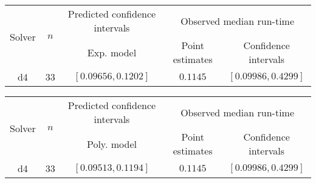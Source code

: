 \begin{tabular}{ccccc}
\hline 
\multirow{2}{*}{Solver} & \multirow{2}{*}{$n$} & Predicted confidence intervals & \multicolumn{2}{c}{Observed median  run-time}\tabularnewline
 &  & Exp. model  & Point estimates  & Confidence intervals\tabularnewline
\hline 
\hline 
\multirow{0}{*}{d4} & 33 & $\mathbf{\left[0.09656,0.1202\right]}$ & $0.1145$ & $\left[0.09986,0.4299\right]$ \tabularnewline 
\hline 
\end{tabular} 

\begin{tabular}{ccccc}
\hline 
\multirow{2}{*}{Solver} & \multirow{2}{*}{$n$} & Predicted confidence intervals & \multicolumn{2}{c}{Observed median  run-time}\tabularnewline
 &  & Poly. model  & Point estimates  & Confidence intervals\tabularnewline
\hline 
\hline 
\multirow{0}{*}{d4} & 33 & $\mathbf{\left[0.09513,0.1194\right]}$ & $0.1145$ & $\left[0.09986,0.4299\right]$ \tabularnewline 
\hline 
\end{tabular} 


